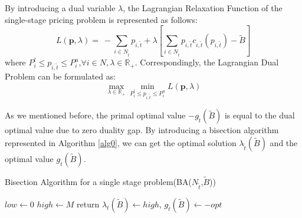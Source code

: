 \documentclass[sigconf,authordraft]{acmart}
\begin{document}
By introducing a dual variable $\lambda$, the Lagrangian Relaxation Function of the single-stage pricing problem is represented as follows:
\begin{equation}
   \label{eqs1.1} L(\boldsymbol{p},\lambda)= ~-\sum_{i\in N_{\tilde{t}}} p_{i,\tilde{t}}+\lambda [\sum_{i\in N_{\tilde{t}}}p_{i,\tilde{t}}c_{i,\tilde{t}}(p_{i,\tilde{t}})- \tilde{B}]
\end{equation}
where $P_i^l\le p_{i,\tilde{t}}\le P_i^u $,$\forall i\in N, \lambda \in \mathbb R_+$.
Correspondingly, the Lagrangian Dual Problem can be formulated as:
\begin{equation}
    \label{eqs1.2}\max_{\lambda \in \mathbb R_+}\min_{P_i^l\le p_{i,\tilde{t}}\le P_i^u} L(\boldsymbol{p},\lambda)
\end{equation}

As we mentioned before, the primal optimal value $-g_{\tilde{t}}(\tilde{B})$ is equal to the dual optimal value due to zero duality gap. By introducing a bisection algorithm represented in Algorithm \ref{alg0}, we can get the optimal solution $\lambda_{\tilde{t}}(\tilde{B})$ and the optimal value $g_{\tilde{t}}(\tilde{B})$.


\begin{algorithm}[t]
\DontPrintSemicolon
{}
   \SetNoFillComment
    \caption{Bisection Algorithm for a single stage problem(BA($N_{\tilde{t}}$,$\tilde{B}$))}\label{alg0}
        $low \gets 0$ \;
        $high \gets M$
        return $\lambda_t(\tilde{B}) \gets high$, $g_{\tilde{t}}(\tilde{B})\gets -opt$
\end{algorithm}
\end{document}
